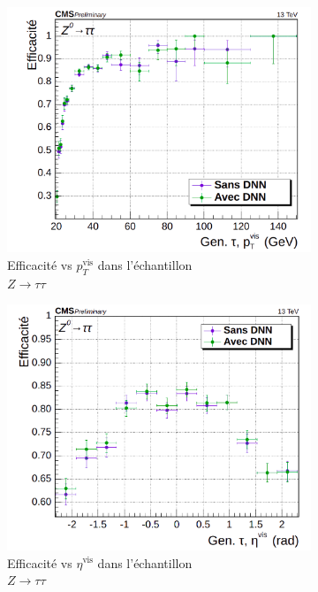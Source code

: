 \begin{figure}[!ht]
\captionsetup{justification=centering}
  \begin{subfigure}{0.5\linewidth}
    \centering
    \includegraphics[width=0.8\linewidth]{Chapitre4/Images/HPSnewDMs_ztt_pt.png} 
    \caption{Efficacité vs $p_T^{\text{vis}}$ dans l'échantillon \\ $Z\rightarrow\tau\tau$} 
  \end{subfigure}
  \begin{subfigure}{0.5\linewidth}
    \centering
    \includegraphics[width=0.8\linewidth]{Chapitre4/Images/HPSnewDMs_ztt_eta.png} 
    \caption{Efficacité vs $\eta^{\text{vis}}$ dans l'échantillon \\ $Z\rightarrow\tau\tau$} 
  \end{subfigure} 
  \begin{subfigure}{0.5\linewidth}
    \centering

\end{subfigure}
\end{figure}
